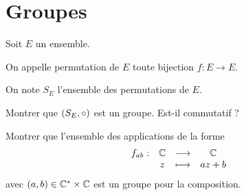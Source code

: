 \begin{corr}
\end{corr}

\section{Groupes}

\begin{exo}
Soit \(E\) un ensemble.

On appelle permutation de \(E\) toute bijection \(f:E\to E\).

On note \(S_E\) l'ensemble des permutations de \(E\).

Montrer que \(\groupe{S_E}[\rond]\) est un groupe. Est-il commutatif ?
\end{exo}

\begin{corr}
\end{corr}

\begin{exo}[Exercice 5]
Montrer que l'ensemble des applications de la forme \[\begin{array}[t]{cccc}f_{ab} : & \mathbb{C} & \longrightarrow & \mathbb{C} \\ & z & \longmapsto & az+b\end{array}\] avec \(\left(a,b\right)\in\mathbb{C}^*\times\mathbb{C}\) est un groupe pour la composition.
\end{exo}

\begin{corr}
\end{corr}

